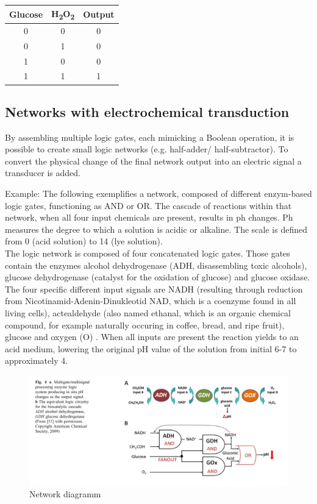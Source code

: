 \documentclass[runningheads]{llncs}
\begin{document}
		\begin{center}
		\begin{tabular}{c|c|c}

			Glucose & H\textsubscript{2}O\textsubscript{2} & Output\\\hline
			0 & 0 & 0\\ 
			0 & 1 & 0\\
			1 & 0 & 0\\
			1 & 1 & 1
		\end{tabular}
		\end{center}
	
\subsection{Networks with electrochemical transduction}

		By assembling multiple logic gates, each mimicking a Boolean operation, it is possible to create small logic networks (e.g. half-adder/ half-subtractor). To convert the physical change of the final network output into an electric signal a transducer is added.
	
		Example: The following exemplifies a network, composed of different enzym-based logic gates, functioning as AND or OR. The cascade of reactions within that network, when all four input chemicals are present, results in ph changes. Ph measures the degree to which a solution is acidic or alkaline. The scale is defined from 0 (acid solution) to 14 (lye solution).\\
		The logic network is composed of four concatenated logic gates. Those gates contain the enzymes alcohol dehydrogenase (ADH, disassembling toxic alcohols), glucose dehydrogenase (catalyst for the oxidation of glucose) and glucose oxidase. The four specific different input signals are NADH (resulting through reduction from Nicotinamid-Adenin-Dinukleotid NAD, which is a coenzyme found in all living cells),  actealdehyde (also named ethanal, which is an organic chemical compound, for example naturally occuring in coffee, bread, and ripe fruit), glucose and oxygen (O) .
	 	When all inputs are present the reaction yields to an acid medium, lowering the original pH value of the solution from initial 6-7 to approximately 4.
		\begin{figure}[H] \centering \includegraphics[scale= 0.3]{pics/biocomputing_sensor.png} \caption{Network diagramm} \label{img:grafik-test} \end{figure}
	
\end{document}
